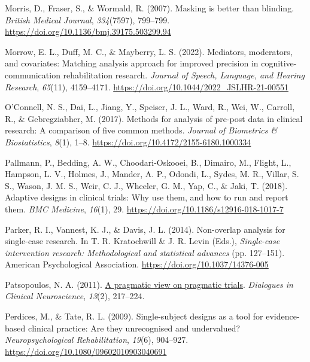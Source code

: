 \documentclass{krantz}
\newlength{\cslhangindent}
\newlength{\cslentryspacingunit} %
\newenvironment{CSLReferences}[2] %
{%
\setlength{\parindent}{0pt}
\ifodd #1
\let\oldpar\par
\def\par{\hangindent=\cslhangindent\oldpar}
\fi
\setlength{\parskip}{#2\cslentryspacingunit}
}%
{}
\begin{document}
\begin{CSLReferences}{1}{0}
\leavevmode{}%
Morris, D., Fraser, S., \& Wormald, R. (2007). Masking is better than blinding. \emph{British Medical Journal}, \emph{334}(7597), 799--799. \url{https://doi.org/10.1136/bmj.39175.503299.94}

\leavevmode{}%
Morrow, E. L., Duff, M. C., \& Mayberry, L. S. (2022). Mediators, moderators, and covariates: Matching analysis approach for improved precision in cognitive-communication rehabilitation research. \emph{Journal of Speech, Language, and Hearing Research}, \emph{65}(11), 4159--4171. \url{https://doi.org/10.1044/2022_JSLHR-21-00551}

\leavevmode{}%
O'Connell, N. S., Dai, L., Jiang, Y., Speiser, J. L., Ward, R., Wei, W., Carroll, R., \& Gebregziabher, M. (2017). Methods for analysis of pre-post data in clinical research: {A} comparison of five common methods. \emph{Journal of Biometrics \& Biostatistics}, \emph{8}(1), 1--8. \url{https://doi.org/10.4172/2155-6180.1000334}

\leavevmode{}%
Pallmann, P., Bedding, A. W., Choodari-Oskooei, B., Dimairo, M., Flight, L., Hampson, L. V., Holmes, J., Mander, A. P., Odondi, L., Sydes, M. R., Villar, S. S., Wason, J. M. S., Weir, C. J., Wheeler, G. M., Yap, C., \& Jaki, T. (2018). Adaptive designs in clinical trials: Why use them, and how to run and report them. \emph{BMC Medicine}, \emph{16}(1), 29. \url{https://doi.org/10.1186/s12916-018-1017-7}

\leavevmode{}%
Parker, R. I., Vannest, K. J., \& Davis, J. L. (2014). Non-overlap analysis for single-case research. In T. R. Kratochwill \& J. R. Levin (Eds.), \emph{Single-case intervention research: {Methodological} and statistical advances} (pp. 127--151). {American Psychological Association}. \url{https://doi.org/10.1037/14376-005}

\leavevmode{}%
Patsopoulos, N. A. (2011). \href{https://www.ncbi.nlm.nih.gov/pmc/articles/PMC3181997}{A pragmatic view on pragmatic trials}. \emph{Dialogues in Clinical Neuroscience}, \emph{13}(2), 217--224.

\leavevmode{}%
Perdices, M., \& Tate, R. L. (2009). Single-subject designs as a tool for evidence-based clinical practice: {Are} they unrecognised and undervalued? \emph{Neuropsychological Rehabilitation}, \emph{19}(6), 904--927. \url{https://doi.org/10.1080/09602010903040691}


\end{CSLReferences}
\end{document}
